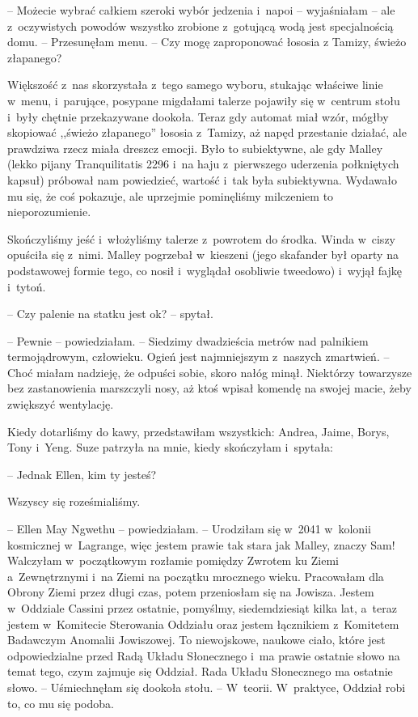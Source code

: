 \documentclass[oneside,polish,11pt,sfheadings]{mwbk}
\begin{document}
-- Możecie wybrać całkiem szeroki wybór jedzenia i~napoi -- wyjaśniałam -- ale z~oczywistych powodów wszystko zrobione z~gotującą wodą jest
specjalnością domu. -- Przesunęłam menu. -- Czy mogę zaproponować łososia
z Tamizy, świeżo złapanego?

Większość z~nas skorzystała z~tego samego wyboru, stukając właściwe
linie w~menu, i~parujące, posypane migdałami talerze pojawiły się w~centrum stołu i~były chętnie przekazywane dookoła. Teraz gdy automat
miał wzór, mógłby skopiować ,,świeżo złapanego'' łososia z~Tamizy, aż
napęd przestanie działać, ale prawdziwa rzecz miała dreszcz emocji. Było
to subiektywne, ale gdy Malley (lekko pijany Tranquilitatis 2296 i~na
haju z~pierwszego uderzenia połkniętych kapsuł) próbował nam powiedzieć,
wartość i~tak była subiektywna. Wydawało mu się, że coś pokazuje, ale
uprzejmie pominęliśmy milczeniem to nieporozumienie.

Skończyliśmy jeść i~włożyliśmy talerze z~powrotem do środka. Winda w~ciszy opuściła się z~nimi. Malley pogrzebał w~kieszeni (jego skafander
był oparty na podstawowej formie tego, co nosił i~wyglądał osobliwie
tweedowo) i~wyjął fajkę i~tytoń.

-- Czy palenie na statku jest ok? -- spytał.

-- Pewnie -- powiedziałam. -- Siedzimy dwadzieścia metrów nad palnikiem
termojądrowym, człowieku. Ogień jest najmniejszym z~naszych zmartwień. -- Choć miałam nadzieję, że odpuści sobie, skoro nałóg minął. Niektórzy
towarzysze bez zastanowienia marszczyli nosy, aż ktoś wpisał komendę na
swojej macie, żeby zwiększyć wentylację.

Kiedy dotarliśmy do kawy, przedstawiłam wszystkich: Andrea, Jaime,
Borys, Tony i~Yeng. Suze patrzyła na mnie, kiedy skończyłam i~spytała: 

-- Jednak Ellen, kim ty jesteś?

Wszyscy się roześmialiśmy. 

-- Ellen May Ngwethu -- powiedziałam. -- Urodziłam się w~2041 w~kolonii kosmicznej w~Lagrange, więc jestem prawie
tak stara jak Malley, znaczy Sam! Walczyłam w~początkowym rozłamie
pomiędzy Zwrotem ku Ziemi a~Zewnętrznymi i~na Ziemi na początku
mrocznego wieku. Pracowałam dla Obrony Ziemi przez długi czas, potem
przeniosłam się na Jowisza. Jestem w~Oddziale Cassini przez ostatnie,
pomyślmy, siedemdziesiąt kilka lat, a~teraz jestem w~Komitecie
Sterowania Oddziału oraz jestem łącznikiem z~Komitetem Badawczym
Anomalii Jowiszowej. To niewojskowe, naukowe ciało, które jest
odpowiedzialne przed Radą Układu Słonecznego i~ma prawie ostatnie słowo
na temat tego, czym zajmuje się Oddział. Rada Układu Słonecznego ma
ostatnie słowo. -- Uśmiechnęłam się dookoła stołu. -- W~teorii. W~praktyce, Oddział robi to, co mu się podoba.
\end{document}
